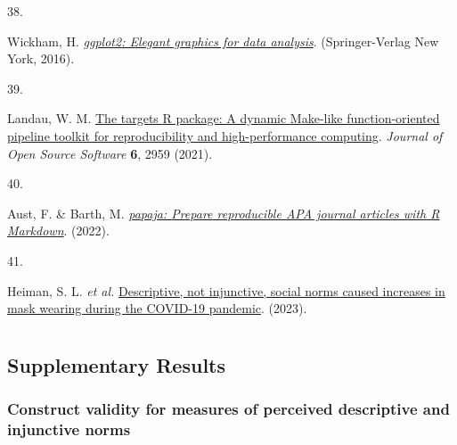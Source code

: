 \documentclass[
  man, donotrepeattitle,floatsintext]{apa6}
\newlength{\cslhangindent}
\newlength{\csllabelwidth}
\newlength{\cslentryspacingunit} %
\newenvironment{CSLReferences}[2] %
 {%
  \setlength{\parindent}{0pt}
  \ifodd #1
  \let\oldpar\par
  \def\par{\hangindent=\cslhangindent\oldpar}
  \fi
  \setlength{\parskip}{#2\cslentryspacingunit}
 }%
 {}
\newcommand{\CSLLeftMargin}[1]{\parbox[t]{\csllabelwidth}{#1}}
\newcommand{\CSLRightInline}[1]{\parbox[t]{\linewidth - \csllabelwidth}{#1}\break}
\begin{document}
\begin{CSLReferences}{0}{0}
\leavevmode{}%
\CSLLeftMargin{38. }%
\CSLRightInline{Wickham, H. \emph{\href{https://ggplot2.tidyverse.org}{{ggplot2}: Elegant graphics for data analysis}}. (Springer-Verlag New York, 2016).}

\leavevmode{}%
\CSLLeftMargin{39. }%
\CSLRightInline{Landau, W. M. \href{https://doi.org/10.21105/joss.02959}{The targets {R} package: A dynamic {M}ake-like function-oriented pipeline toolkit for reproducibility and high-performance computing}. \emph{Journal of Open Source Software} \textbf{6}, 2959 (2021).}

\leavevmode{}%
\CSLLeftMargin{40. }%
\CSLRightInline{Aust, F. \& Barth, M. \emph{\href{https://github.com/crsh/papaja}{{papaja}: {Prepare} reproducible {APA} journal articles with {R Markdown}}}. (2022).}

\leavevmode{}%
\CSLLeftMargin{41. }%
\CSLRightInline{Heiman, S. L. \emph{et al.} \href{https://github.com/ScottClaessens/covidMaskWearing}{Descriptive, not injunctive, social norms caused increases in mask wearing during the COVID-19 pandemic}. (2023).}

\end{CSLReferences}

\endgroup

\newpage

\hypertarget{appendix-appendix}{%
\appendix}


\renewcommand{\appendixname}{\textbf{Supplementary Material}}
\renewcommand{\thefigure}{S\arabic{figure}} \setcounter{figure}{0}
\renewcommand{\thetable}{S\arabic{table}} \setcounter{table}{0}
\renewcommand{\theequation}{S\arabic{table}} \setcounter{equation}{0}

\hypertarget{section}{%
\section{}\label{section}}

\hypertarget{supplementary-results}{%
\subsection{Supplementary Results}\label{supplementary-results}}

\hypertarget{construct-validity-for-measures-of-perceived-descriptive-and-injunctive-norms}{%
\subsubsection{Construct validity for measures of perceived descriptive and injunctive norms}\label{construct-validity-for-measures-of-perceived-descriptive-and-injunctive-norms}}
\end{document}
